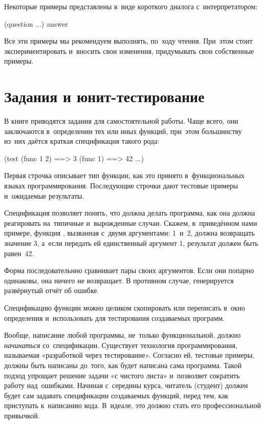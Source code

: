 Некоторые примеры представлены в~виде короткого диалога с~интерпретатором:

\REPL
  {(question ...)}
  {answer}

Все эти примеры мы рекомендуем выполнять, по~ходу чтения. При~этом стоит экспериментировать и~вносить свои изменения, придумывать свои собственные примеры.

\section{Задания и юнит-тестирование}%
В книге приводятся задания для самостоятельной работы. Чаще всего, они заключаются в~определении тех или иных функций, при~этом большинству из~них даётся краткая спецификация такого рода:

\begin{Specification}
(test 
  (func 1 2)  ==> 3
  (func 1)    ==> 42
  ...)
\end{Specification}

\noindent Первая строчка описывает тип функции, как это принято в~функциональных языках программирования. Последующие строчки дают тестовые примеры и~ожидаемые результаты. 

Спецификация позволяет понять, что должна делать программа, как она должна реагировать на~типичные и~вырожденные случаи. Скажем, в~приведённом нами примере, функция , вызванная с~двумя аргументами: 1~и~2, должна возвращать значение 3, а~если передать ей единственный аргумент 1, результат должен быть равен~42.

Форма   последовательнно сравнивает пары своих аргументов. Если они попарно одинаковы, она ничего не возвращает. В противном случае, генерируется развёрнутый отчёт об ошибке.

Спецификацию функции можно целиком скопировать или переписать в~окно определения  и~использовать для тестирования создаваемых программ.

Вообще, написание любой программы, не~только функциональной, должно \emph{начинаться} со~спецификации. Существует технология программирования, называемая «разработкой через тестирование». Согласно ей, тестовые примеры, должны быть написаны до~того, как будет написана сама программа. Такой подход упрощает решение задачи «с чистого листа» и~позволяет сократить работу над~ошибками. Начиная с~середины курса, читатель (студент) должен будет сам задавать спецификации создаваемых функций, перед тем, как приступать к~написанию кода. В~идеале, это должно стать его профессиональной привычкой.

